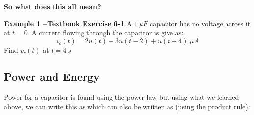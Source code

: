 \documentclass{handout}
\begin{document}
\textbf{So what does this all mean?}


\newpage
\clearpage
\pagebreak

\textbf{Example 1 --Textbook Exercise 6-1} A $1\ \mu F$ capacitor has no voltage across it at $t=0$.  A current flowing through the capacitor is give as:
\begin{equation}
i_c(t) = 2u(t)-3u(t-2)+u(t-4)\ \mu A
\end{equation}
Find $v_c(t)$ at $t=4\ s$


\newpage
\clearpage
\pagebreak

\subsection{Power and Energy}
Power for a capacitor is found using the power law
but using what we learned above, we can write this as
which can also be written as (using the product rule):
\end{document}
